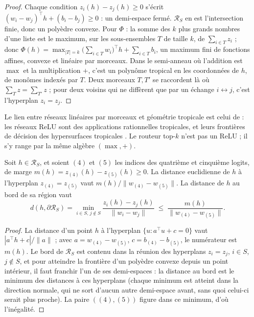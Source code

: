 \begin{proof}
Chaque condition $z_i(h) - z_j(h) \ge 0$ s'écrit $(w_i - w_j)^{\top} h + (b_i - b_j) \ge 0$ : un demi-espace fermé. $\mathcal{R}_S$ en est l'intersection finie, donc un polyèdre convexe. Pour $\Phi$ : la somme des $k$ plus grands nombres d'une liste est le maximum, sur les sous-ensembles $T$ de taille $k$, de $\sum_{i \in T} z_i$ ; donc $\Phi(h) = \max_{|T| = k} \bigl(\sum_{i \in T} w_i\bigr)^{\top} h + \sum_{i \in T} b_i$, un maximum fini de fonctions affines, convexe et linéaire par morceaux. Dans le semi-anneau où l'addition est $\max$ et la multiplication $+$, c'est un polynôme tropical en les coordonnées de $h$, de monômes indexés par $T$. Deux morceaux $T, T'$ se raccordent là où $\sum_T z = \sum_{T'} z$ ; pour deux voisins qui ne diffèrent que par un échange $i \leftrightarrow j$, c'est l'hyperplan $z_i = z_j$.
\end{proof}

Le lien entre réseaux linéaires par morceaux et géométrie tropicale est celui de \textcite{zhang2018tropical} : les réseaux ReLU sont des applications rationnelles tropicales, et leurs frontières de décision des hypersurfaces tropicales \litt. Le routeur top-$k$ n'est pas un ReLU ; il s'y range par la même algèbre $(\max, +)$.

\begin{proposition}\label{t3syn:prop:marge}
Soit $h \in \mathcal{R}_S$, et soient $(4)$ et $(5)$ les indices des quatrième et cinquième logits, de marge $m(h) = z_{(4)}(h) - z_{(5)}(h) \ge 0$. La distance euclidienne de $h$ à l'hyperplan $z_{(4)} = z_{(5)}$ vaut $m(h)/\|w_{(4)} - w_{(5)}\|$. La distance de $h$ au bord de sa région vaut
\[
d(h, \partial\mathcal{R}_S) = \min_{i \in S,\, j \notin S} \frac{z_i(h) - z_j(h)}{\|w_i - w_j\|} \;\le\; \frac{m(h)}{\|w_{(4)} - w_{(5)}\|}.
\]
\end{proposition}

\begin{proof}
La distance d'un point $h$ à l'hyperplan $\{u : a^{\top}u + c = 0\}$ vaut $|a^{\top}h + c|/\|a\|$ ; avec $a = w_{(4)} - w_{(5)}$, $c = b_{(4)} - b_{(5)}$, le numérateur est $m(h)$. Le bord de $\mathcal{R}_S$ est contenu dans la réunion des hyperplans $z_i = z_j$, $i \in S$, $j \notin S$, et pour atteindre la frontière d'un polyèdre convexe depuis un point intérieur, il faut franchir l'un de ses demi-espaces : la distance au bord est le minimum des distances à ces hyperplans (chaque minimum est atteint dans la direction normale, qui ne sort d'aucun autre demi-espace avant, sans quoi celui-ci serait plus proche). La paire $((4), (5))$ figure dans ce minimum, d'où l'inégalité.
\end{proof}

